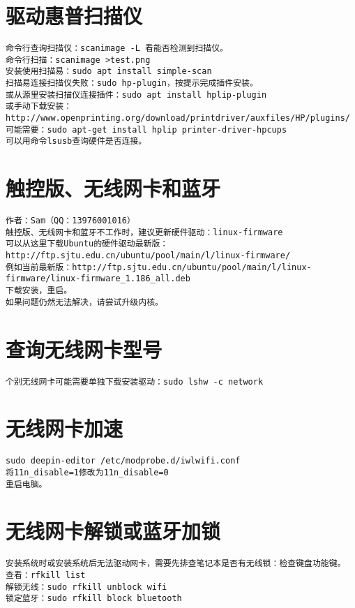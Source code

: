\documentclass[a4paper,fontset=fandol,zihao=-4,linespread=1.2]{ctexbook}
\begin{document}
\section{驱动惠普扫描仪}
\begin{lstlisting}
命令行查询扫描仪：scanimage -L 看能否检测到扫描仪。
命令行扫描：scanimage >test.png
安装使用扫描易：sudo apt install simple-scan
扫描易连接扫描仪失败：sudo hp-plugin，按提示完成插件安装。
或从源里安装扫描仪连接插件：sudo apt install hplip-plugin
或手动下载安装：http://www.openprinting.org/download/printdriver/auxfiles/HP/plugins/
可能需要：sudo apt-get install hplip printer-driver-hpcups
可以用命令lsusb查询硬件是否连接。
\end{lstlisting}

\section{触控版、无线网卡和蓝牙}
\begin{lstlisting}
作者：Sam（QQ：13976001016）
触控版、无线网卡和蓝牙不工作时，建议更新硬件驱动：linux-firmware
可以从这里下载Ubuntu的硬件驱动最新版：http://ftp.sjtu.edu.cn/ubuntu/pool/main/l/linux-firmware/
例如当前最新版：http://ftp.sjtu.edu.cn/ubuntu/pool/main/l/linux-firmware/linux-firmware_1.186_all.deb
下载安装，重启。
如果问题仍然无法解决，请尝试升级内核。
\end{lstlisting}

\section{查询无线网卡型号}
\begin{lstlisting}
个别无线网卡可能需要单独下载安装驱动：sudo lshw -c network
\end{lstlisting}

\section{无线网卡加速}
\begin{lstlisting}
sudo deepin-editor /etc/modprobe.d/iwlwifi.conf
将11n_disable=1修改为11n_disable=0
重启电脑。
\end{lstlisting}

\section{无线网卡解锁或蓝牙加锁}
\begin{lstlisting}
安装系统时或安装系统后无法驱动网卡，需要先排查笔记本是否有无线锁：检查键盘功能键。
查看：rfkill list
解锁无线：sudo rfkill unblock wifi
锁定蓝牙：sudo rfkill block bluetooth
\end{lstlisting}
\end{document}
